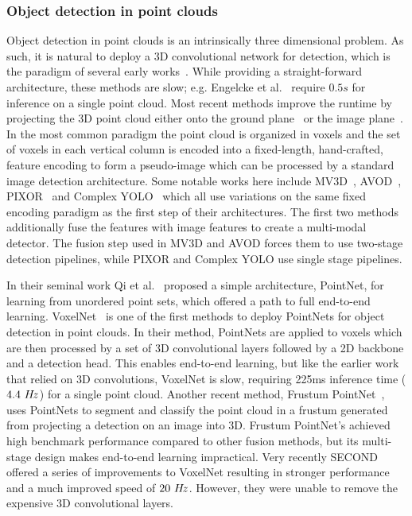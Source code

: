 \documentclass[10pt,twocolumn,letterpaper]{article}
\newcommand{\squeeze}{\vspace{-0.5mm}}
\begin{document}
\squeeze
\subsubsection{Object detection in \lidar point clouds}
\squeeze
Object detection in point clouds is an intrinsically three dimensional problem.
As such, it is natural to deploy a 3D convolutional network for detection, which is the paradigm of several early works~\cite{engelcke2017vote3deep,li20173d}.
While providing a straight-forward architecture, these methods are slow; e.g. Engelcke et al.~\cite{engelcke2017vote3deep} require $0.5s$ for inference on a single point cloud.
Most recent methods improve the runtime by projecting the 3D point cloud either onto the ground plane~\cite{avod, mv3d} or the image plane~\cite{fcl}.
In the most common paradigm the point cloud is organized in voxels and the set of voxels in each vertical column is encoded into a fixed-length, hand-crafted, feature encoding to form a pseudo-image which can be processed by a standard image detection architecture.
Some notable works here include MV3D~\cite{mv3d}, AVOD~\cite{avod}, PIXOR~\cite{pixor} and Complex YOLO~\cite{complexyolo} which all use variations on the same fixed encoding paradigm as the first step of their architectures.
The first two methods additionally fuse the \lidar features with image features to create a multi-modal detector.
The fusion step used in MV3D and AVOD forces them to use two-stage detection pipelines, while PIXOR and Complex YOLO use single stage pipelines.

In their seminal work Qi et al.~\cite{pointnet, pointnetplusplus} proposed a simple architecture, PointNet, for learning from unordered point sets, which offered a path to full end-to-end learning.
VoxelNet~\cite{voxelnet} is one of the first methods to deploy PointNets for object detection in \lidar point clouds.
In their method, PointNets are applied to voxels which are then processed by a set of 3D convolutional layers followed by a 2D backbone and a detection head.
This enables end-to-end learning, but like the earlier work that relied on 3D convolutions, VoxelNet is slow, requiring 225ms inference time ($4.4~H\hspace{-.5mm}z$) for a single point cloud.
Another recent method, Frustum PointNet~\cite{frustum}, uses PointNets to segment and classify the point cloud in a frustum generated from projecting a detection on an image into 3D.
Frustum PointNet's achieved high benchmark performance compared to other fusion methods, but its multi-stage design makes end-to-end learning impractical.
Very recently SECOND~\cite{second} offered a series of improvements to VoxelNet resulting in stronger performance and a much improved speed of $20~H\hspace{-.5mm}z$.
However, they were unable to remove the expensive 3D convolutional layers.
\end{document}
